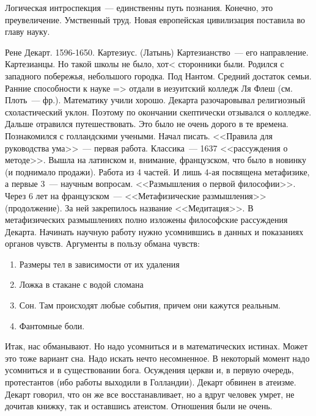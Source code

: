 Логическая интроспекция~--- единственны путь познания. Конечно, это преувеличение. Умственный труд. Новая европейская цивилизация поставила во главу науку.

Рене Декарт. 1596-1650.
Картезиус. (Латынь)
Картезианство~--- его направление. Картезианцы. Но такой школы не было, хот< сторонники были.
Родился с западного побережья, небольшого городка. Под Нантом. Средний достаток семьи. Ранние способности к науке => отдали в иезуитский колледж Ля Флеш (см. Плоть~--- фр.). Математику учили хорошо. Декарта разочаровывал религиозный схоластический уклон. Поэтому по окончании скептически отзывался о колледже. Дальше отравился путешествовать. Это было не очень дорого в те времена. Познакомился с голландскими учеными. Начал писать. <<Правила для руководства ума>>~--- первая работа. Классика~--- 1637 <<рассуждения о методе>>. Вышла на латинском и, внимание, французском, что было в новинку (и поднимало продажи). Работа из 4 частей. И лишь 4-ая посвящена метафизике, а первые 3~--- научным вопросам. <<Размышления о первой философии>>. Через 6 лет на французском~--- <<Метафизические размышления>> (продолжение). За ней закрепилось название <<Медитация>>. В метафизических размышлениях полно изложены философские рассуждения Декарта. Начинать научную работу нужно усомнившись в данных и показаниях органов чувств. Аргументы в пользу обмана чувств:

\begin{enumerate}
	\item Размеры тел в зависимости от их удаления
	\item Ложка в стакане с водой сломана
	\item Сон. Там происходят любые события, причем они кажутся реальным.
	\item Фантомные боли.
\end{enumerate}

Итак, нас обманывают. Но надо усомниться и в математических истинах. Может это тоже вариант сна. Надо искать нечто несомненное. В некоторый момент надо усомниться и в существовании бога. Осуждения церкви и, в первую очередь, протестантов (ибо работы выходили в Голландии). Декарт обвинен в атеизме. Декарт говорил, что он же все восстанавливает, но а вдруг человек умрет, не дочитав книжку, так и оставшись атеистом. Отношения были не очень.

